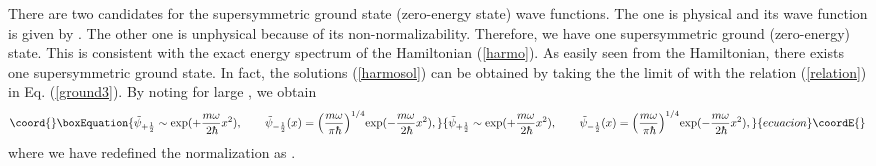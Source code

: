 \documentclass[a4paper,12pt]{article}
\begin{document}
There are two candidates for the supersymmetric ground 
state (zero-energy state) wave functions. 
The one is physical and its wave function is given 
by \coordHE{}. The other 
one \coordHE{} is unphysical because of its 
non-normalizability. Therefore, we have one supersymmetric 
ground (zero-energy) state. This is consistent with the exact energy 
spectrum of the Hamiltonian (\ref{harmo}). As easily seen from the 
Hamiltonian, there exists one supersymmetric ground state.
In fact, the solutions (\ref{harmosol}) can be obtained by taking the 
the limit of \coordHE{} with the relation (\ref{relation}) 
in Eq. (\ref{ground3}). 
By noting \coordHE{} for large \coordHE{},
we obtain
\begin{equation}\coord{}\boxEquation{
{\tilde\psi}_{+\half}\sim {\rm exp}(+{{m\omega}\over {2\hbar}} x^2),\qquad
{\tilde\psi}_{-\half}(x)= \Bigl({{m\omega}\over {\pi\hbar}}\Bigr)^{1/4}
{\rm exp}(-{{m\omega}\over {2\hbar}} x^2),
}{
{\tilde\psi}_{+\half}\sim {\rm exp}(+{{m\omega}\over {2\hbar}} x^2),\qquad
{\tilde\psi}_{-\half}(x)= \Bigl({{m\omega}\over {\pi\hbar}}\Bigr)^{1/4}
{\rm exp}(-{{m\omega}\over {2\hbar}} x^2),
}{ecuacion}\coordE{}\end{equation}
where we have redefined the normalization as 
\coordHE{}. 
\end{document}
